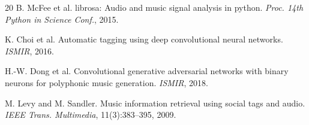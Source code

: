 \documentclass{article}
\begin{document}
\begin{thebibliography}{20}
B. McFee et al.
\newblock librosa: Audio and music signal analysis in python.
\newblock \textit{Proc. 14th Python in Science Conf.}, 2015.

K. Choi et al.
\newblock Automatic tagging using deep convolutional neural networks.
\newblock \textit{ISMIR}, 2016.

H.-W. Dong et al.
\newblock Convolutional generative adversarial networks with binary neurons for polyphonic music generation.
\newblock \textit{ISMIR}, 2018.

M. Levy and M. Sandler.
\newblock Music information retrieval using social tags and audio.
\newblock \textit{IEEE Trans. Multimedia}, 11(3):383--395, 2009.

\end{thebibliography}
\end{document}
